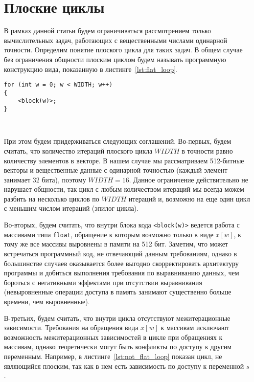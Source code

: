 \documentclass[
11pt,%
tightenlines,%
twoside,%
onecolumn,%
nofloats,%
nobibnotes,%
nofootinbib,%
superscriptaddress,%
noshowpacs,%
centertags]%
{revtex4}
\begin{document}
\section{Плоские циклы}

В рамках данной статьи будем ограничиваться рассмотрением только вычислительных задач, работающих с вещественными числами одинарной точности.
Определим понятие плоского цикла для таких задач.
В общем случае без ограничения общности плоским циклом будем называть программную конструкцию вида, показанную в листинге~\ref{lst:flat_loop}.

\begin{lstlisting}[caption={Общий вид плоского цикла.},label={lst:flat_loop}]
for (int w = 0; w < WIDTH; w++)
{
    <block(w)>;
}
\end{lstlisting}

\

При этом будем придерживаться следующих соглашений.
Во-первых, будем считать, что количество итераций плоского цикла $WIDTH$ в точности равно количеству элементов в векторе.
В нашем случае мы рассматриваем 512-битные векторы и вещественные данные с одинарной точностью (каждый элемент занимает 32 бита), поэтому $WIDTH = 16$.
Данное ограничение действительно не нарушает общности, так цикл с любым количеством итераций мы всегда можем разбить на несколько циклов по $WIDTH$ итераций и, возможно на еще один цикл с меньшим числом итераций (эпилог цикла).

Во-вторых, будем считать, что внутри блока кода \texttt{<block(w)>} ведется работа с массивами типа \texttt{float}, обращение к которым возможно только в виде $x[w]$, к тому же все массивы выровнены в памяти на 512 бит.
Заметим, что может встречаться программный код, не отвечающий данным требованиям, однако в большинстве случаев оказывается более выгодно скорректировать архитектуру программы и добиться выполнения требования по выравниванию данных, чем бороться с негативными эффектами при отсутствии выравнивания (невыровненные операции доступа в память занимают существенно больше времени, чем выровненные).

В-третьих, будем считать, что внутри цикла отсутствуют межитерационные зависимости.
Требования на обращения вида $x[w]$ к массивам исключают возможность межитерационных зависимостей в цикле при обращениях к массивам, однако теоретически могут быть конфликты по доступу к другим переменным.
Например, в листинге~\ref{lst:not_flat_loop} показан цикл, не являющийся плоским, так как в нем есть зависимость по доступу к переменной $s$.
\end{document}

